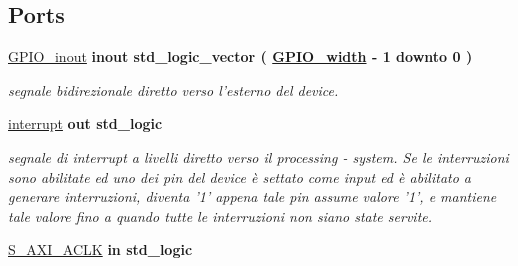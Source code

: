 \subsection*{Ports}
 \begin{DoxyCompactItemize}
\item 
\hypertarget{group___a_x_i-internal_ga8829699d739ef35a4c5da396ffd38387}{\hyperlink{group___a_x_i-internal_ga8829699d739ef35a4c5da396ffd38387}{G\+P\+I\+O\+\_\+inout}  {\bfseries {\bfseries \textcolor{vhdlchar}{inout}\textcolor{vhdlchar}{ }}} {\bfseries \textcolor{vhdlchar}{std\+\_\+logic\+\_\+vector}\textcolor{vhdlchar}{ }\textcolor{vhdlchar}{(}\textcolor{vhdlchar}{ }\textcolor{vhdlchar}{ }\textcolor{vhdlchar}{ }\textcolor{vhdlchar}{ }{\bfseries \hyperlink{group___a_x_i-internal_ga0b52ca75e9a6093b2b60d5e851803069}{G\+P\+I\+O\+\_\+width}} \textcolor{vhdlchar}{-\/}\textcolor{vhdlchar}{ } \textcolor{vhdldigit}{1} \textcolor{vhdlchar}{ }\textcolor{vhdlchar}{downto}\textcolor{vhdlchar}{ }\textcolor{vhdlchar}{ } \textcolor{vhdldigit}{0} \textcolor{vhdlchar}{ }\textcolor{vhdlchar}{)}\textcolor{vhdlchar}{ }} }\label{group___a_x_i-internal_ga8829699d739ef35a4c5da396ffd38387}

\begin{DoxyCompactList}\small\item\em segnale bidirezionale diretto verso l'esterno del device. \end{DoxyCompactList}\item 
\hypertarget{group___a_x_i-internal_ga5b78f3e3edfaf6e8ec79031b9e631e9d}{\hyperlink{group___a_x_i-internal_ga5b78f3e3edfaf6e8ec79031b9e631e9d}{interrupt}  {\bfseries {\bfseries \textcolor{vhdlchar}{out}\textcolor{vhdlchar}{ }}} {\bfseries \textcolor{vhdlchar}{std\+\_\+logic}\textcolor{vhdlchar}{ }} }\label{group___a_x_i-internal_ga5b78f3e3edfaf6e8ec79031b9e631e9d}

\begin{DoxyCompactList}\small\item\em segnale di interrupt a livelli diretto verso il processing -\/ system. Se le interruzioni sono abilitate ed uno dei pin del device è settato come input ed è abilitato a generare interruzioni, diventa '1' appena tale pin assume valore '1', e mantiene tale valore fino a quando tutte le interruzioni non siano state servite. \end{DoxyCompactList}\item 
\hypertarget{group___a_x_i-internal_ga3f54d782a88290bdaa6baffd7cd84ab4}{\hyperlink{group___a_x_i-internal_ga3f54d782a88290bdaa6baffd7cd84ab4}{S\+\_\+\+A\+X\+I\+\_\+\+A\+C\+L\+K}  {\bfseries {\bfseries \textcolor{vhdlchar}{in}\textcolor{vhdlchar}{ }}} {\bfseries \textcolor{vhdlchar}{std\+\_\+logic}\textcolor{vhdlchar}{ }} }\label{group___a_x_i-internal_ga3f54d782a88290bdaa6baffd7cd84ab4}


\end{DoxyCompactItemize}
